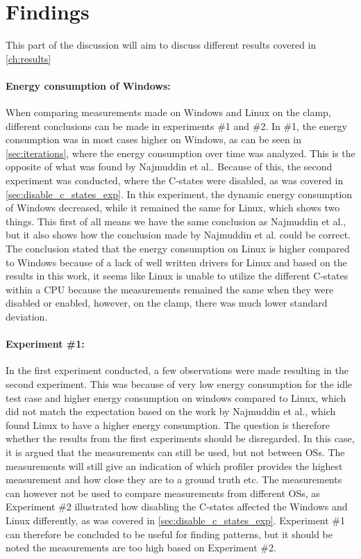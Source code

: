 \section{Findings}

This part of the discussion will aim to discuss different results covered in \cref{ch:results}

\paragraph*{Energy consumption of Windows:} When comparing measurements made on Windows and Linux on the clamp, different conclusions can be made in experiments \#1 and \#2. In \#1, the energy consumption was in most cases higher on Windows, as can be seen in \cref*{sec:iterations}, where the energy consumption over time was analyzed. This is the opposite of what was found by Najmuddin et al.\cite*[]{Najmuddin2021}. Because of this, the second experiment was conducted, where the C-states were disabled, as was covered in \cref*{sec:disable_c_states_exp}. In this experiment, the dynamic energy consumption of Windows decreased, while it remained the same for Linux, which shows two things. This first of all means we have the same conclusion as Najmuddin et al.\cite*[]{Najmuddin2021}, but it also shows how the conclusion made by Najmuddin et al.\cite*[]{Najmuddin2021} could be correct. The conclusion stated that the energy consumption on Linux is higher compared to Windows because of a lack of well written drivers for Linux and based on the results in this work, it seems like Linux is unable to utilize the different C-states within a CPU because the measurements remained the same when they were disabled or enabled, however, on the clamp, there was much lower standard deviation.

\paragraph*{Experiment \#1:} In the first experiment conducted, a few observations were made resulting in the second experiment. This was because of very low energy consumption for the idle test case and higher energy consumption on windows compared to Linux, which did not match the expectation based on the work by Najmuddin et al.\cite*[]{Najmuddin2021}, which found Linux to have a higher energy consumption. The question is therefore whether the results from the first experiments should be disregarded. In this case, it is argued that the measurements can still be used, but not between OSs. The measurements will still give an indication of which profiler provides the highest measurement and how close they are to a ground truth etc. The measurements can however not be used to compare measurements from different OSs, as Experiment \#2 illustrated how disabling the C-states affected the Windows and Linux differently, as was covered in \cref{sec:disable_c_states_exp}. Experiment \#1 can therefore be concluded to be useful for finding patterns, but it should be noted the measurements are too high based on Experiment \#2.

